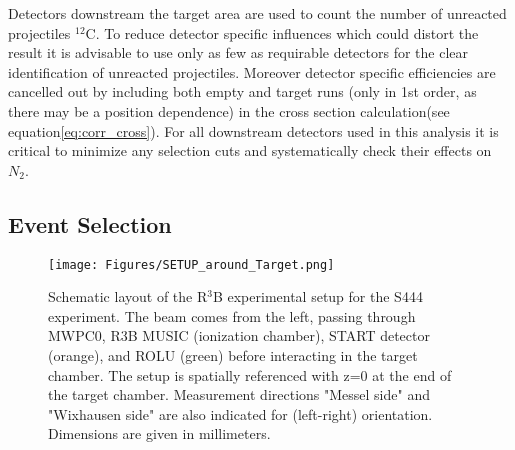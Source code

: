 \begin{enumerate}
Detectors downstream the target area are used to count the number of unreacted projectiles $^{12}$C. To reduce detector specific influences which could distort the result it is advisable to use only as few as requirable detectors for the clear identification of unreacted projectiles. Moreover detector specific efficiencies are cancelled out by including both empty and target runs (only in 1st order, as there may be a position dependence) in the cross section calculation(see equation\ref{eq:corr_cross}). For all downstream detectors used in this analysis it is critical to minimize any selection cuts and systematically check their effects on $N_2$.
\end{enumerate}
\subsection{Event Selection}\label{subsec:event-sel}
\begin{figure}[htpb]
    \centering
    \texttt{[image: Figures/SETUP\_around\_Target.png]}
    \caption{
    Schematic layout of the R$^3$B experimental setup for the S444 experiment. The beam comes from the left, passing through MWPC0, R3B MUSIC (ionization chamber), START detector (orange), and ROLU (green) before interacting in the target chamber. The setup is spatially referenced with z=0 at the end of the target chamber. Measurement directions "Messel side" and "Wixhausen side" are also indicated for (left-right) orientation. Dimensions are given in millimeters. 
    }
    \label{fig:setup_target_region}
\end{figure}

